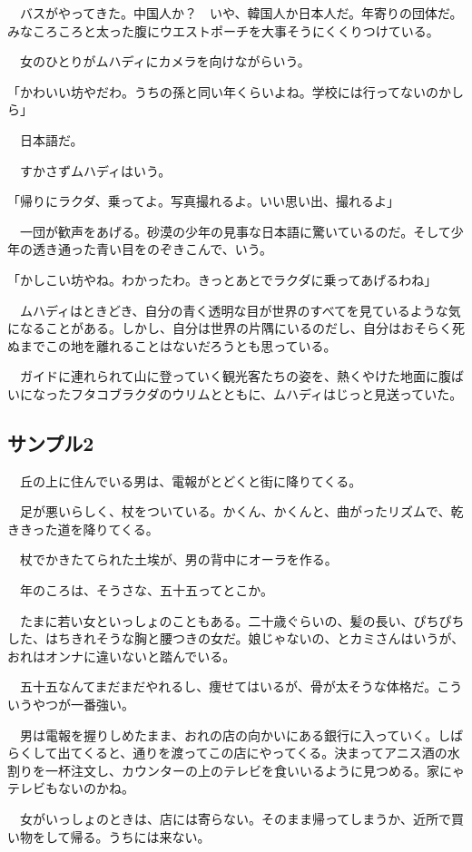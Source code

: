 \documentclass[10pt,a4paper,openright]{ltjsbook}
\begin{document}
　バスがやってきた。中国人か？　いや、韓国人か日本人だ。年寄りの団体だ。みなころころと太った腹にウエストポーチを大事そうにくくりつけている。

　女のひとりがムハディにカメラを向けながらいう。

「かわいい坊やだわ。うちの孫と同い年くらいよね。学校には行ってないのかしら」

　日本語だ。

　すかさずムハディはいう。

「帰りにラクダ、乗ってよ。写真撮れるよ。いい思い出、撮れるよ」

　一団が歓声をあげる。砂漠の少年の見事な日本語に驚いているのだ。そして少年の透き通った青い目をのぞきこんで、いう。

「かしこい坊やね。わかったわ。きっとあとでラクダに乗ってあげるわね」

　ムハディはときどき、自分の青く透明な目が世界のすべてを見ているような気になることがある。しかし、自分は世界の片隅にいるのだし、自分はおそらく死ぬまでこの地を離れることはないだろうとも思っている。

　ガイドに連れられて山に登っていく観光客たちの姿を、熱くやけた地面に腹ばいになったフタコブラクダのウリムとともに、ムハディはじっと見送っていた。

\subsection{サンプル2}

　丘の上に住んでいる男は、電報がとどくと街に降りてくる。

　足が悪いらしく、杖をついている。かくん、かくんと、曲がったリズムで、乾ききった道を降りてくる。

　杖でかきたてられた土埃が、男の背中にオーラを作る。

　年のころは、そうさな、五十五ってとこか。

　たまに若い女といっしょのこともある。二十歳ぐらいの、髪の長い、ぴちぴちした、はちきれそうな胸と腰つきの女だ。娘じゃないの、とカミさんはいうが、おれはオンナに違いないと踏んでいる。

　五十五なんてまだまだやれるし、痩せてはいるが、骨が太そうな体格だ。こういうやつが一番強い。

　男は電報を握りしめたまま、おれの店の向かいにある銀行に入っていく。しばらくして出てくると、通りを渡ってこの店にやってくる。決まってアニス酒の水割りを一杯注文し、カウンターの上のテレビを食いいるように見つめる。家にゃテレビもないのかね。

　女がいっしょのときは、店には寄らない。そのまま帰ってしまうか、近所で買い物をして帰る。うちには来ない。
\end{document}
